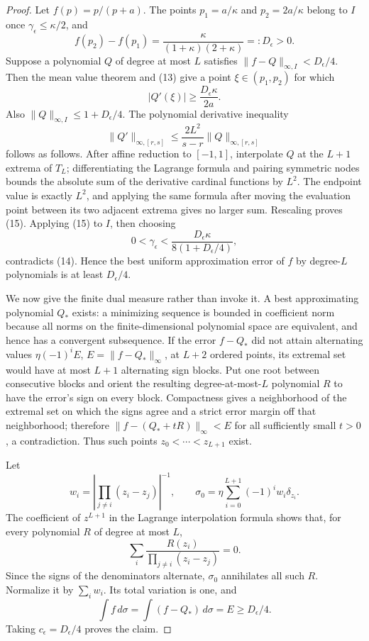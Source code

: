 \documentclass{article}
\begin{document}
\begin{proof}
Let \(f(p)=p/(p+a)\).  The points \(p_1=a/\kappa\) and \(p_2=2a/\kappa\) belong to \(I\) once \(\gamma_\epsilon\le\kappa/2\), and
\[
 f(p_2)-f(p_1)=\frac{\kappa}{(1+\kappa)(2+\kappa)}=:D_\epsilon>0. \tag{13}
\]
Suppose a polynomial \(Q\) of degree at most \(L\) satisfies \(\|f-Q\|_{\infty,I}<D_\epsilon/4\).  Then the mean value theorem and (13) give a point \(\xi\in(p_1,p_2)\) for which
\[
 |Q'(\xi)|\ge \frac{D_\epsilon\kappa}{2a}. \tag{14}
\]
Also \(\|Q\|_{\infty,I}\le1+D_\epsilon/4\).  The polynomial derivative inequality
\[
 \|Q'\|_{\infty,[r,s]}\le \frac{2L^2}{s-r}\|Q\|_{\infty,[r,s]} \tag{15}
\]
follows as follows.  After affine reduction to \([-1,1]\), interpolate \(Q\) at the \(L+1\) extrema of \(T_L\); differentiating the Lagrange formula and pairing symmetric nodes bounds the absolute sum of the derivative cardinal functions by \(L^2\).  The endpoint value is exactly \(L^2\), and applying the same formula after moving the evaluation point between its two adjacent extrema gives no larger sum.  Rescaling proves (15).  Applying (15) to \(I\), then choosing
\[
 0<\gamma_\epsilon<\frac{D_\epsilon\kappa}{8(1+D_\epsilon/4)},
\]
contradicts (14).  Hence the best uniform approximation error of \(f\) by degree-\(L\) polynomials is at least \(D_\epsilon/4\).

We now give the finite dual measure rather than invoke it.  A best approximating polynomial \(Q_*\) exists: a minimizing sequence is bounded in coefficient norm because all norms on the finite-dimensional polynomial space are equivalent, and hence has a convergent subsequence.  If the error \(f-Q_*\) did not attain alternating values \(\eta(-1)^iE\), \(E=\|f-Q_*\|_\infty\), at \(L+2\) ordered points, its extremal set would have at most \(L+1\) alternating sign blocks.  Put one root between consecutive blocks and orient the resulting degree-at-most-\(L\) polynomial \(R\) to have the error's sign on every block.  Compactness gives a neighborhood of the extremal set on which the signs agree and a strict error margin off that neighborhood; therefore \(\|f-(Q_*+tR)\|_\infty<E\) for all sufficiently small \(t>0\), a contradiction.  Thus such points \(z_0<\cdots<z_{L+1}\) exist.

Let
\[
 w_i=\left|\prod_{j\ne i}(z_i-z_j)\right|^{-1},\qquad
 \sigma_0=\eta\sum_{i=0}^{L+1}(-1)^iw_i\delta_{z_i}.
\]
The coefficient of \(z^{L+1}\) in the Lagrange interpolation formula shows that, for every polynomial \(R\) of degree at most \(L\),
\[
 \sum_i\frac{R(z_i)}{\prod_{j\ne i}(z_i-z_j)}=0.
\]
Since the signs of the denominators alternate, \(\sigma_0\) annihilates all such \(R\).  Normalize it by \(\sum_iw_i\).  Its total variation is one, and
\[
 \int f\,d\sigma=\int(f-Q_*)\,d\sigma=E\ge D_\epsilon/4.
\]
Taking \(c_\epsilon=D_\epsilon/4\) proves the claim.
\end{proof}
\end{document}
